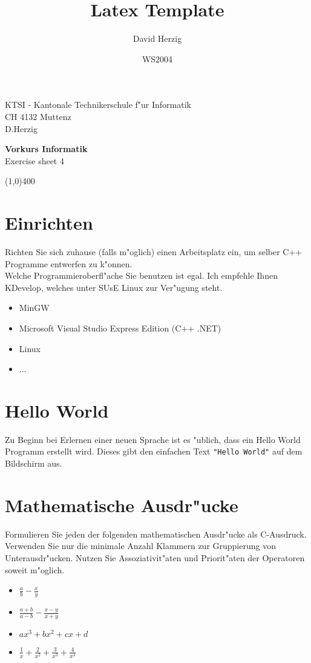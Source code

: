 \documentclass[a4paper,10pt]{article}
\title{Latex Template}
\author{David Herzig}
\date{WS2004}
\begin{document}
KTSI - Kantonale Technikerschule f"ur Informatik\\
CH 4132 Muttenz\\
D.Herzig

\vspace{2mm}

\begin{center}
{\Large \bf Vorkurs Informatik}\\
Exercise sheet 4
\end{center}

\vspace{2mm}

\line(1,0){400}

\vspace{5mm}

\section{Einrichten}
Richten Sie sich zuhause (falls m"oglich) einen Arbeitsplatz ein, um selber C++ Programme entwerfen zu k"onnen.\\
Welche Programmieroberfl"ache Sie benutzen ist egal. Ich empfehle Ihnen KDevelop, welches unter SUsE Linux zur Ver"ugung steht.

\begin{itemize}
\item MinGW
\item Microsoft Visual Studio Express Edition (C++ .NET)
\item Linux
\item ...
\end{itemize}

\section{Hello World}
Zu Beginn bei Erlernen einer neuen Sprache ist es "ublich, dass ein Hello World Programm erstellt wird. Dieses gibt den einfachen Text \verb|"Hello World"| auf dem Bildschirm aus.

\section{Mathematische Ausdr"ucke}
Formulieren Sie jeden der folgenden mathematischen Ausdr"ucke als
C-Ausdruck. Verwenden Sie nur die minimale Anzahl Klammern zur Gruppierung von
Unterausdr"ucken. Nutzen Sie Assoziativit"aten und Priorit"aten der Operatoren
soweit m"oglich.

\begin{itemize}
\item $\frac{a}{b} - \frac{x}{y}$

\item $\frac{a+b}{a-b} - \frac{x-y}{x+y}$

\item $ax^{3}+bx^{2}+cx+d$

\item $\frac{1}{x}+\frac{2}{x^{2}}+\frac{3}{x^{3}}+\frac{4}{x^{4}}$
\end{itemize}
\end{document}
